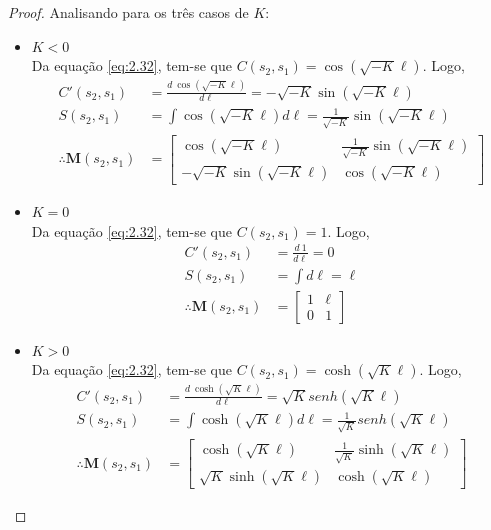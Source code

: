 \begin{proof}Analisando para os três casos de $K$:
	\begin{itemize}
	\item $K<0$\\
	
	Da equação \eqref{eq:2.32}, tem-se que $C(s_2,s_1) = \cos(\sqrt{-K}\ell)$. Logo,
	\begin{align*}
        C'(s_2,s_1) &= \frac{d\ \cos(\sqrt{-K}\ell)}{d\ell} = -\sqrt{-K}\sin(\sqrt{-K}\ell)\\
        S(s_2,s_1) &= \int \cos(\sqrt{-K}\ell)d\ell = \frac{1}{\sqrt{-K}}\sin(\sqrt{-K}\ell)\\
        \therefore \boldsymbol{M}(s_2,s_1) &= \begin{bmatrix}
            \cos(\sqrt{-K}\ell) & \frac{1}{\sqrt{-K}}\sin(\sqrt{-K}\ell)\\
            -\sqrt{-K}\sin(\sqrt{-K}\ell) & \cos(\sqrt{-K}\ell)
            \end{bmatrix}
	\end{align*}
	\item $K=0$\\
	
	Da equação \eqref{eq:2.32}, tem-se que $C(s_2,s_1) = 1$. Logo,
	\begin{align*}
		C'(s_2,s_1) &= \frac{d \ 1}{d\ell} = 0\\
		S(s_2,s_1) &= \int d\ell = \ell\\
		\therefore \boldsymbol{M}(s_2,s_1) &= \begin{bmatrix}
				1 & \ell\\
				0 & 1
				\end{bmatrix}
	\end{align*}
	\item $K>0$\\
	
	Da equação \eqref{eq:2.32}, tem-se que $C(s_2,s_1) = \cosh(\sqrt{K}\ell)$. Logo,
		\begin{align*}
        	C'(s_2,s_1) &= \frac{d\ \cosh(\sqrt{K}\ell)}{d\ell} = \sqrt{K}senh(\sqrt{K}\ell)\\
            S(s_2,s_1) &= \int \cosh(\sqrt{K}\ell)d\ell = \frac{1}{\sqrt{K}}senh(\sqrt{K}\ell)\\
            \therefore \boldsymbol{M}(s_2,s_1) &= \begin{bmatrix}
            \cosh(\sqrt{K}\ell) & \frac{1}{\sqrt{K}}\sinh(\sqrt{K}\ell)\\
            \sqrt{K}\sinh(\sqrt{K}\ell) & \cosh(\sqrt{K}\ell)
            \end{bmatrix}
		\end{align*}
	\end{itemize}
\end{proof}
	
